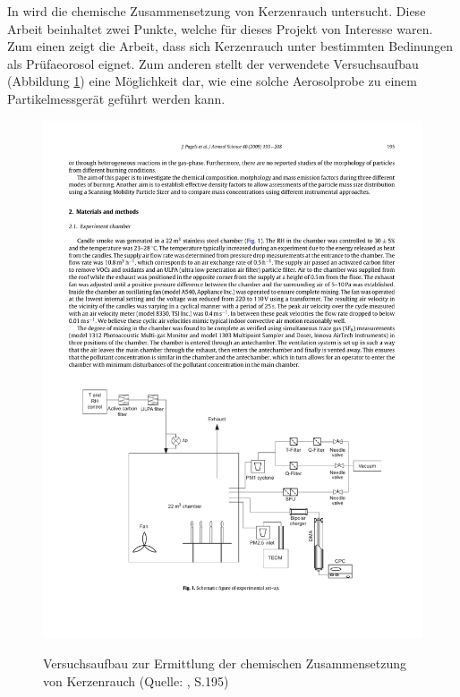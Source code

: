 In \cite{candle} wird die chemische Zusammensetzung von Kerzenrauch untersucht. Diese Arbeit beinhaltet zwei Punkte, welche f\"{u}r dieses Projekt von Interesse waren. Zum einen zeigt die Arbeit, dass sich Kerzenrauch unter bestimmten Bedinungen als Pr\"{u}faeorosol eignet. Zum anderen stellt der verwendete Versuchsaufbau (Abbildung \ref{fig:kerze_exp}) eine M\"{o}glichkeit dar, wie eine solche Aerosolprobe zu einem Partikelmessger\"{a}t gef\"{u}hrt werden kann. 

\begin{figure}[H]
	\myfloatalign
	{\includegraphics[width=.9\linewidth]{gfx/related/kerze_versuch.pdf}} \quad
	\caption[Versuchsaufbau zur Ermittlung der chemischen Zusammensetzung von Kerzenrauch (Quelle: \cite{candle}, S.195)]
	{Versuchsaufbau zur Ermittlung der chemischen Zusammensetzung von Kerzenrauch (Quelle: \cite{candle}, S.195)}
	\label{fig:kerze_exp}
\end{figure} 

